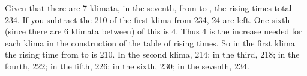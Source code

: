 Given that there are 7 klimata, in the seventh, from \Cancer\xspace to \Sagittarius, the rising times total 234. If
you subtract the 210 of the first klima from 234, 24 are left. One-sixth (since there are 6 klimata between) of this is 4. Thus 4 is the increase needed for each klima in the construction of the table of rising times. So in the first klima the rising time from \Cancer\xspace to \Sagittarius\xspace is 210. In the second klima, 214; in the
third, 218; in the fourth, 222; in the fifth, 226; in the sixth, 230; in the seventh, 234.

\newpage